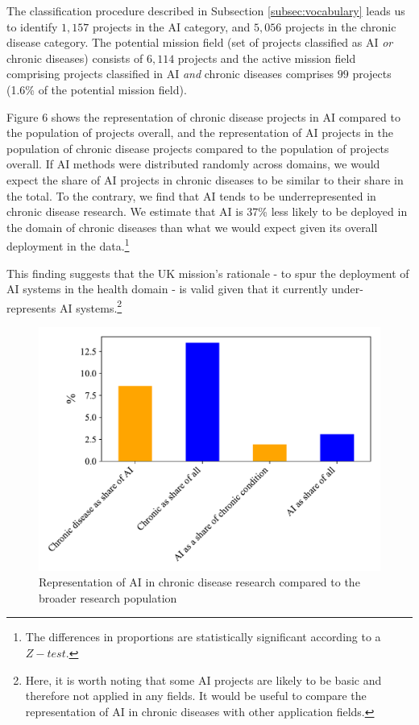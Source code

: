 \documentclass[11pt]{article}
\begin{document}
The classification procedure described in Subsection \ref{subsec:vocabulary} leads us to identify $1,157$ projects in the AI category, and $5,056$ projects in the chronic disease category. The potential mission field (set of projects classified as AI \textit{or} chronic diseases) consists of $6,114$ projects and the active mission field comprising projects classified in AI \textit{and} chronic diseases comprises $99$ projects (1.6\% of the potential mission field).

Figure 6 shows the representation of chronic disease projects in AI compared to the population of projects overall, and the representation of AI projects in the population of chronic disease projects compared to the population of projects overall. If AI methods were distributed randomly across domains, we would expect the share of AI projects in chronic diseases to be similar to their share in the total.  To the contrary, we find that AI tends to be underrepresented in chronic disease research. We estimate that AI is 37\% less likely to be deployed in the domain of chronic diseases than what we would expect given its overall deployment in the data.\footnote{The differences in proportions are statistically significant according to a $Z-test$.}

This finding suggests that the UK mission's rationale - to spur the deployment of AI systems in the health domain - is valid given that it currently under-represents AI systems.\footnote{Here, it is worth noting that some AI projects are likely to be basic and therefore not applied in any fields. It would be useful to compare the representation of AI in chronic diseases with other application fields.} 

\begin{figure}[!ht]
    \centering
    \includegraphics[width=\textwidth]{figures/fig_6_mission_levels.pdf}
    \caption{Representation of AI in chronic disease research compared to the broader research population}
    \label{fig:active_field}
\end{figure}
\end{document}

